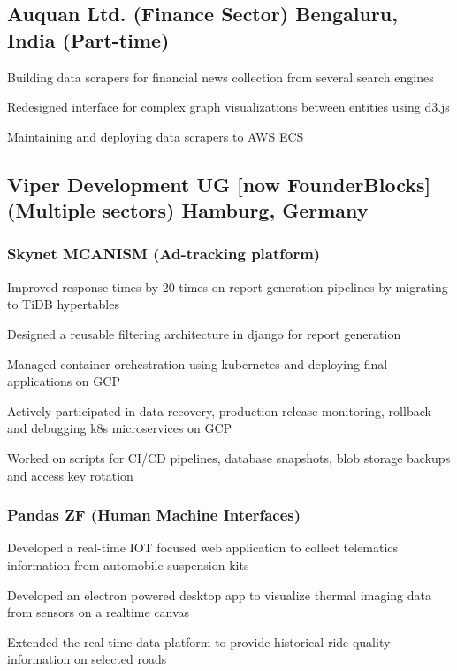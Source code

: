 \subsection{Auquan Ltd. (Finance Sector) \hfill Bengaluru, India (Part-time)}
\begin{zitemize}
    \item Building data scrapers for financial news collection from several search
    engines
    \item Redesigned interface for complex graph visualizations between entities using d3.js
    \item Maintaining and deploying data scrapers to AWS ECS
\end{zitemize}


\subsection{Viper Development UG [now FounderBlocks] (Multiple sectors) \hfill Hamburg, Germany}

\vspace{1em}
\subsubsection*{Skynet MCANISM (Ad-tracking platform)}
\begin{zitemize}
    \item Improved response times by 20 times on report generation pipelines by migrating to TiDB hypertables
    \item Designed a reusable filtering architecture in django for report generation
    \item Managed container orchestration using kubernetes and deploying final
    applications on GCP
    \item Actively participated in data recovery, production release monitoring, rollback
    and debugging k8s microservices on GCP
    \item Worked on scripts for CI/CD pipelines, database snapshots, blob storage backups
    and access key rotation
\end{zitemize}

\pagebreak

\subsubsection*{Pandas ZF (Human Machine Interfaces)}
\begin{zitemize}
    \item Developed a real-time IOT focused web application to collect telematics
    information from automobile suspension kits
    \item Developed an electron powered desktop app to visualize thermal imaging data
    from sensors on a realtime canvas
    \item Extended the real-time data platform to provide historical ride quality
    information on selected roads
\end{zitemize}

